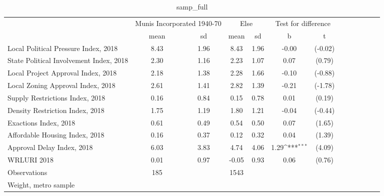 \begin{table}[htbp]\centering
\def\sym#1{\ifmmode^{#1}\else\(^{#1}\)\fi}
\caption{samp\_full \label{tab1}}
\begin{tabular}{l*{3}{cccc}}
\toprule
                    &\multicolumn{2}{c}{Munis Incorporated 1940-70}&\multicolumn{2}{c}{Else} &\multicolumn{2}{c}{Test for difference}\\
                    &        mean&          sd&        mean&          sd&           b         &           t\\
\midrule
Local Political Pressure Index, 2018&        8.43&        1.96&        8.43&        1.96&       -0.00         &     (-0.02)\\
State Political Involvement Index, 2018&        2.30&        1.16&        2.23&        1.07&        0.07         &      (0.79)\\
Local Project Approval Index, 2018&        2.18&        1.38&        2.28&        1.66&       -0.10         &     (-0.88)\\
Local Zoning Approval Index, 2018&        2.61&        1.41&        2.82&        1.39&       -0.21         &     (-1.78)\\
Supply Restrictions Index, 2018&        0.16&        0.84&        0.15&        0.78&        0.01         &      (0.19)\\
Density Restriction Index, 2018&        1.75&        1.19&        1.80&        1.21&       -0.04         &     (-0.44)\\
Exactions Index, 2018&        0.61&        0.49&        0.54&        0.50&        0.07         &      (1.65)\\
Affordable Housing Index, 2018&        0.16&        0.37&        0.12&        0.32&        0.04         &      (1.39)\\
Approval Delay Index, 2018&        6.03&        3.83&        4.74&        4.06&        1.29\sym{***}&      (4.09)\\
WRLURI 2018         &        0.01&        0.97&       -0.05&        0.93&        0.06         &      (0.76)\\
\midrule
Observations        &         185&            &        1543&            &                     &            \\
\bottomrule
\multicolumn{7}{l}{\footnotesize Weight, metro sample}\\
\end{tabular}
\end{table}
